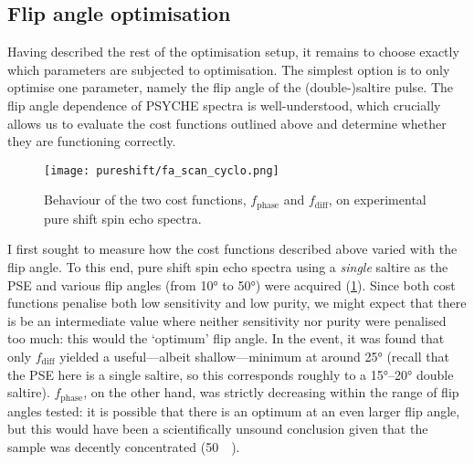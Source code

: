 \subsection{Flip angle optimisation}
\label{subsec:pureshift__faopt}

Having described the rest of the optimisation setup, it remains to choose exactly which parameters are subjected to optimisation.
The simplest option is to only optimise one parameter, namely the flip angle of the (double-)saltire pulse.
The flip angle dependence of PSYCHE spectra is well-understood, which crucially allows us to evaluate the cost functions outlined above and determine whether they are functioning correctly.

\begin{figure}[htb]
    \centering
    \texttt{[image: pureshift/fa\_scan\_cyclo.png]}
    \caption[Behaviour of $f_\text{phase}$ and $f_\text{diff}$ on experimental pure shift spin echo spectra.]{
        Behaviour of the two cost functions, $f_\text{phase}$ and $f_\text{diff}$, on experimental pure shift spin echo spectra.
    }
    \label{fig:fa_scan_cyclo}
\end{figure}

I first sought to measure how the cost functions described above varied with the flip angle.
To this end, pure shift spin echo spectra using a \textit{single} saltire as the PSE and various flip angles (from \ang{10} to \ang{50}) were acquired (\cref{fig:fa_scan_cyclo}).
Since both cost functions penalise both low sensitivity and low purity, we might expect that there is be an intermediate value where neither sensitivity nor purity were penalised too much: this would the `optimum' flip angle.
In the event, it was found that only $f_\text{diff}$ yielded a useful---albeit shallow---minimum at around \ang{25} (recall that the PSE here is a single saltire, so this corresponds roughly to a \ang{15}--\ang{20} double saltire).
$f_\text{phase}$, on the other hand, was strictly decreasing within the range of flip angles tested: it is possible that there is an optimum at an even larger flip angle, but this would have been a scientifically unsound conclusion given that the sample was decently concentrated (\SI{50}{\milli\molar}).

